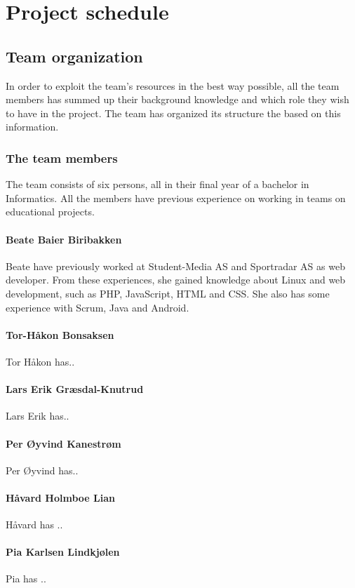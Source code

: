 
\chapter{Project schedule}

\section{Team organization}
In order to exploit the team's resources in the best way possible, all the team members has summed up their background knowledge and which role they wish to have in the project. The team has organized its structure the based on this information.

\subsection{The team members}
The team consists of six persons, all in their final year of a bachelor in Informatics. All the members have previous experience on working in teams on educational projects.

\subsubsection{Beate Baier Biribakken}
Beate have previously worked at Student-Media AS and Sportradar AS as web developer. From these experiences, she gained knowledge about Linux and web development, such as PHP, JavaScript, HTML and CSS. She also has some experience with Scrum, Java and Android.

\subsubsection{Tor-Håkon Bonsaksen}
Tor Håkon has..
\subsubsection{Lars Erik Græsdal-Knutrud}
 Lars Erik has..
\subsubsection{Per Øyvind Kanestrøm}
Per Øyvind has..

\subsubsection{Håvard	Holmboe	Lian}
Håvard has ..
\subsubsection{Pia	Karlsen	Lindkjølen}
Pia has ..


